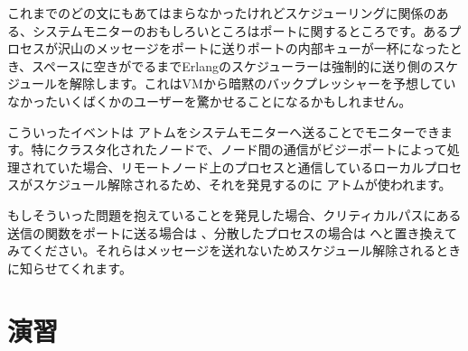 これまでのどの文にもあてはまらなかったけれどスケジューリングに関係のある、システムモニターのおもしろいところはポートに関するところです。あるプロセスが沢山のメッセージをポートに送りポートの内部キューが一杯になったとき、スペースに空きがでるまでErlangのスケジューラーは強制的に送り側のスケジュールを解除します。これはVMから暗黙のバックプレッシャーを予想していなかったいくばくかのユーザーを驚かせることになるかもしれません。

こういったイベントは  アトムをシステムモニターへ送ることでモニターできます。特にクラスタ化されたノードで、ノード間の通信がビジーポートによって処理されていた場合、リモートノード上のプロセスと通信しているローカルプロセスがスケジュール解除されるため、それを発見するのに  アトムが使われます。

もしそういった問題を抱えていることを発見した場合、クリティカルパスにある送信の関数をポートに送る場合は 、分散したプロセスの場合は  へと置き換えてみてください。それらはメッセージを送れないためスケジュール解除されるときに知らせてくれます。

\section{演習}

